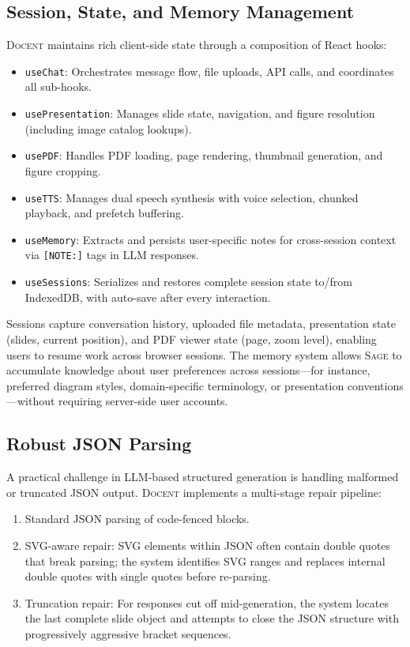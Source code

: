 \documentclass[11pt,a4paper]{article}
\newcommand{\system}{\textsc{Docent}\xspace}
\newcommand{\sage}{\textsc{Sage}\xspace}
\begin{document}
\subsection{Session, State, and Memory Management}

\system maintains rich client-side state through a composition of React hooks:

\begin{itemize}[leftmargin=*,nosep]
    \item \texttt{useChat}: Orchestrates message flow, file uploads, API calls, and coordinates all sub-hooks.
    \item \texttt{usePresentation}: Manages slide state, navigation, and figure resolution (including image catalog lookups).
    \item \texttt{usePDF}: Handles PDF loading, page rendering, thumbnail generation, and figure cropping.
    \item \texttt{useTTS}: Manages dual speech synthesis with voice selection, chunked playback, and prefetch buffering.
    \item \texttt{useMemory}: Extracts and persists user-specific notes for cross-session context via \texttt{[NOTE:]} tags in LLM responses.
    \item \texttt{useSessions}: Serializes and restores complete session state to/from IndexedDB, with auto-save after every interaction.
\end{itemize}

Sessions capture conversation history, uploaded file metadata, presentation state (slides, current position), and PDF viewer state (page, zoom level), enabling users to resume work across browser sessions.
The memory system allows \sage to accumulate knowledge about user preferences across sessions---for instance, preferred diagram styles, domain-specific terminology, or presentation conventions---without requiring server-side user accounts.

\subsection{Robust JSON Parsing}

A practical challenge in LLM-based structured generation is handling malformed or truncated JSON output.
\system implements a multi-stage repair pipeline:

\begin{enumerate}[leftmargin=*,nosep]
    \item Standard JSON parsing of code-fenced blocks.
    \item SVG-aware repair: SVG elements within JSON often contain double quotes that break parsing; the system identifies SVG ranges and replaces internal double quotes with single quotes before re-parsing.
    \item Truncation repair: For responses cut off mid-generation, the system locates the last complete slide object and attempts to close the JSON structure with progressively aggressive bracket sequences.
\end{enumerate}
\end{document}
